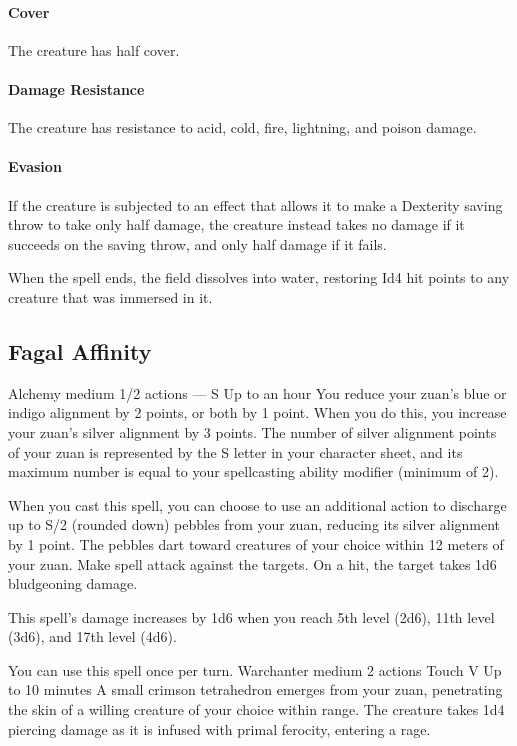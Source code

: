         \paragraph{Cover}
        The creature has half cover.
        \paragraph{Damage Resistance}
        The creature has resistance to acid, cold, fire, lightning, and poison damage.
        \paragraph{Evasion}
        If the creature is subjected to an effect that allows it to make a Dexterity saving throw to take only half damage, the creature instead takes no damage if it succeeds on the saving throw, and only half damage if it fails.

        When the spell ends, the field dissolves into water, restoring Id4 hit points to any creature that was immersed in it.
\subsection*{Fagal Affinity}
        {Alchemy medium}
        {1/2 actions}
        {---}
        {S}
        {Up to an hour}
        You reduce your zuan's blue or indigo alignment by 2 points, or both by 1 point.
        When you do this, you increase your zuan's silver alignment by 3 points.
        The number of silver alignment points of your zuan is represented by the S letter in your character sheet, and its maximum number is equal to your spellcasting ability modifier (minimum of 2).

        When you cast this spell, you can choose to use an additional action to discharge up to S/2 (rounded down) pebbles from your zuan, reducing its silver alignment by 1 point.
        The pebbles dart toward creatures of your choice within 12 meters of your zuan.
        Make spell attack against the targets.
        On a hit, the target takes 1d6 bludgeoning damage.

        This spell's damage increases by 1d6 when you reach 5th level (2d6), 11th level (3d6), and 17th level (4d6).

        You can use this spell once per turn.
        {Warchanter medium}
        {2 actions}
        {Touch}
        {V}
        {Up to 10 minutes}
        A small crimson tetrahedron emerges from your zuan, penetrating the skin of a willing creature of your choice within range.
        The creature takes 1d4 piercing damage as it is infused with primal ferocity, entering a rage.

